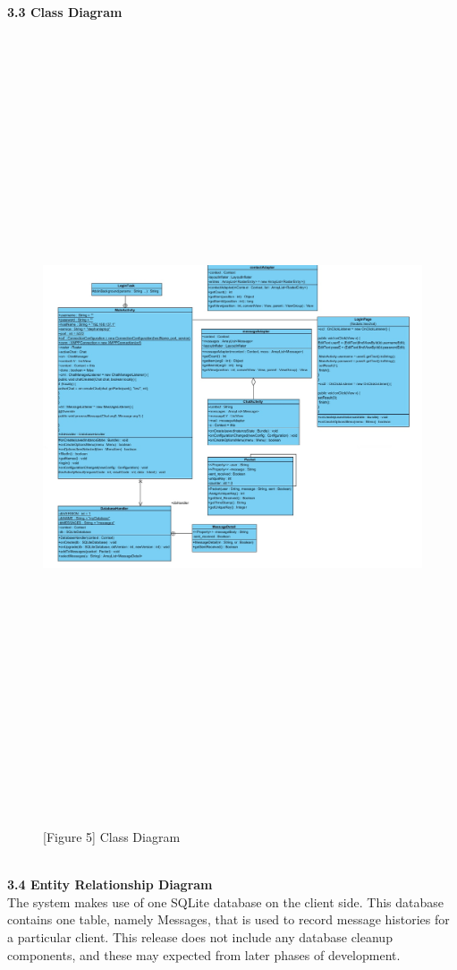 \documentclass[29pt,a4paper]{moderncv}
\begin{document}
\newpage	
	\noindent \\ \left\textbf{3.3 Class Diagram}\\
			\begin{figure}
				\centering
				\\ \includegraphics[width=7.0in, height=8.5in]{./Class_Diagram.jpg}
				\\\caption{[Figure 5] Class Diagram}\\
			\end{figure}
	
	\\ \noindent \textbf{3.4 Entity Relationship Diagram}
	\\The system makes use of one SQLite database on the client side.  This database contains one table, namely Messages, that is used to record message histories for a particular client.  This release does not include any database cleanup components, and these may expected from later phases of development.
	\\ \\
	
\end{document}
